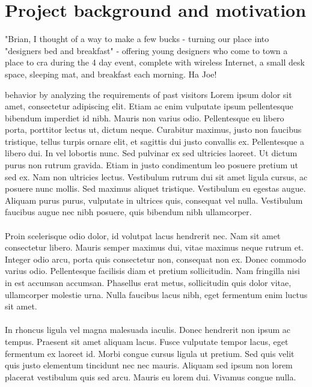 \documentclass[journal]{IEEEtran}
\begin{document}
\section{Project background and motivation}
\noindent \begin{itshape}"Brian, I thought of a way to make a few bucks - turning our place into "designers bed and breakfast" - offering young designers who come to town a place to cra during the 4 day event, complete with wireless Internet, a small desk space, sleeping mat, and breakfast each morning. Ha Joe! \\
\end{itshape}
behavior by analyzing the requirements of past visitors 
Lorem ipsum dolor sit amet, consectetur adipiscing elit. Etiam ac enim vulputate ipsum pellentesque bibendum imperdiet id nibh. Mauris non varius odio. Pellentesque eu libero porta, porttitor lectus ut, dictum neque. Curabitur maximus, justo non faucibus tristique, tellus turpis ornare elit, et sagittis dui justo convallis ex. Pellentesque a libero dui. In vel lobortis nunc. Sed pulvinar ex sed ultricies laoreet. Ut dictum purus non rutrum gravida. Etiam in justo condimentum leo posuere pretium ut sed ex. Nam non ultricies lectus. Vestibulum rutrum dui sit amet ligula cursus, ac posuere nunc mollis. Sed maximus aliquet tristique. Vestibulum eu egestas augue. Aliquam purus purus, vulputate in ultrices quis, consequat vel nulla. Vestibulum faucibus augue nec nibh posuere, quis bibendum nibh ullamcorper.\\\\Proin scelerisque odio dolor, id volutpat lacus hendrerit nec. Nam sit amet consectetur libero. Mauris semper maximus dui, vitae maximus neque rutrum et. Integer odio arcu, porta quis consectetur non, consequat non ex. Donec commodo varius odio. Pellentesque facilisis diam et pretium sollicitudin. Nam fringilla nisi in est accumsan accumsan. Phasellus erat metus, sollicitudin quis dolor vitae, ullamcorper molestie urna. Nulla faucibus lacus nibh, eget fermentum enim luctus sit amet.\\\\In rhoncus ligula vel magna malesuada iaculis. Donec hendrerit non ipsum ac tempus. Praesent sit amet aliquam lacus. Fusce vulputate tempor lacus, eget fermentum ex laoreet id. Morbi congue cursus ligula ut pretium. Sed quis velit quis justo elementum tincidunt nec nec mauris. Aliquam sed ipsum non lorem placerat vestibulum quis sed arcu. Mauris eu lorem dui. Vivamus congue nulla.
\ifCLASSOPTIONcaptionsoff
  \newpage
\fi


\vfill
\end{document}

